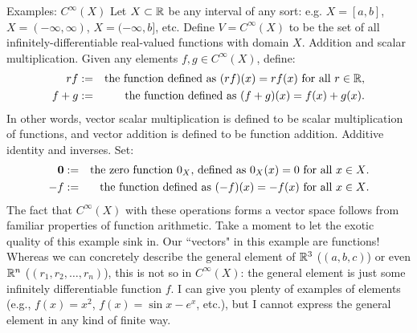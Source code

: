 \begin{frame}{Examples: \alert{$C^\infty(X)$}}
Let $X\subset{\mathbb R}$ be any interval of any sort: e.g. $X=[a,b]$, $X=(-\infty, \infty)$, $X=(-\infty, b]$, etc.  Define $V=C^\infty(X)$ to be the set of all infinitely-differentiable real-valued functions with domain $X$. 
\bpause
\alert{Addition and scalar multiplication}.
Given any elements $f, g\in C^\infty(X)$, define:
\begin{eqnarray*}
rf&:=&\text{the function defined as $(rf)(x)=rf(x)$ for all $r\in{\mathbb R}$},\\
f+g&:=&\text{the function defined as $(f+g)(x)=f(x)+g(x)$.}
\end{eqnarray*}
In other words, vector scalar multiplication is defined to be scalar multiplication of functions, and vector addition is defined to be function addition. 
\bpause 
\alert{Additive identity and inverses}. 
Set: 
\begin{eqnarray*}
{\mathbf 0}&:=&\text{the zero function $0_X$, defined as $0_X(x)=0$ for all $x\in X$.}\\
-f&:=&\text{the function defined as $(-f)(x)=-f(x)$ for all $x\in X$}.
\end{eqnarray*}
\pause The fact that $C^\infty(X)$ with these operations forms a vector space follows from familiar properties of \alert{function arithmetic}.
\bpause Take a moment to let the exotic quality of this example sink in. Our ``vectors" in this example are \alert{functions}!  Whereas we can concretely describe the general element of ${\mathbb R}^3$ ($(a,b,c)$) or even ${\mathbb R}^n$ ($(r_1,r_2,\dots, r_n)$), this is not so in $C^\infty(X)$: the general element is just some infinitely differentiable function $f$. I can give you plenty of examples of elements (e.g., $f(x)=x^2$, $f(x)=\sin x-e^x$, etc.), but I cannot express the general element in any kind of finite way.  
\end{frame}
